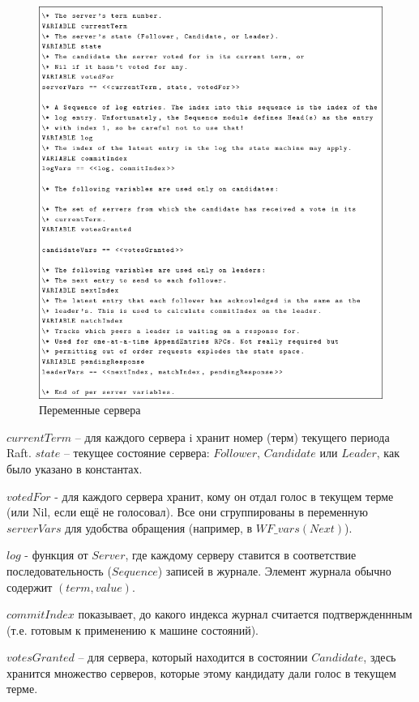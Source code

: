 \begin{figure}
  \centering
  \includegraphics[scale=0.6]{inc/tla-03.png}
  \caption{Переменные сервера}
  \label{fig:tla-03}
\end{figure}

$currentTerm$ – для каждого сервера i хранит номер (терм) текущего периода Raft.
$state$ – текущее состояние сервера: $Follower$, $Candidate$ или $Leader$, как
было указано в константах.

$votedFor$ - для каждого сервера хранит, кому он отдал голос в текущем терме
(или Nil, если ещё не голосовал). Все они сгруппированы в переменную $serverVars$
для удобства обращения (например, в $WF\_vars(Next)$).

$log$ - функция от $Server$, где каждому серверу ставится в соответствие
последовательность ($Sequence$) записей в журнале. Элемент журнала обычно
содержит $(term, value)$.

$commitIndex$ показывает, до какого индекса журнал считается подтвержденнным
(т.е. готовым к применению к машине состояний).

$votesGranted$ – для сервера, который находится в состоянии $Candidate$, здесь
хранится множество серверов, которые этому кандидату дали голос в текущем терме.

